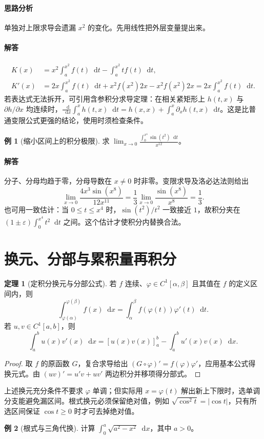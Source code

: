\documentclass[UTF8,fontset=fandol,12pt,oneside,openany]{ctexrep}
\newcommand{\dd}{\mathop{}\!\mathrm d}
\theoremstyle{definition}
\newtheorem{theorem}{定理}[chapter]
\newtheorem{example}{例}[chapter]
\begin{document}
\paragraph{思路分析} 单独对上限求导会遗漏 $x^2$ 的变化。先用线性把外层变量提出来。
\paragraph{解答}
\begin{align*}
K(x)&=x^2\int_a^{x^2}f(t)\dd t-\int_a^{x^2}tf(t)\dd t,\\
K'(x)&=2x\int_a^{x^2}f(t)\dd t+x^2f(x^2)2x-x^2f(x^2)2x
=2x\int_a^{x^2}f(t)\dd t.
\end{align*}
若表达式无法拆开，可引用含参积分求导定理：在相关紧矩形上 $h(t,x)$ 与 $\partial h/\partial x$ 均连续时，$\frac{\dd}{\dd x}\int_a^xh(t,x)\dd t=h(x,x)+\int_a^x\partial_xh(t,x)\dd t$。这是比普通变限公式更强的结论，使用时须检查条件。

\begin{example}[缩小区间上的积分极限]
求 $\lim_{x\to0}\frac{\int_0^{x^4}\sin(t^2)\dd t}{x^{12}}$。
\end{example}
\paragraph{解答} 分子、分母均趋于零，分母导数在 $x\ne0$ 时非零。变限求导及洛必达法则给出
\[\lim_{x\to0}\frac{4x^3\sin(x^8)}{12x^{11}}=\frac13\lim_{x\to0}\frac{\sin(x^8)}{x^8}=\frac13.\]
也可用一致估计：当 $0\le t\le x^4$ 时，$\sin(t^2)/t^2$ 一致接近 $1$，故积分夹在 $(1\pm\varepsilon)\int_0^{x^4}t^2\dd t$ 之间。这个估计才使积分内替换合法。

\section{换元、分部与累积量再积分}
\label{lec:11:calculation}
\begin{theorem}[定积分换元与分部公式]
若 $f$ 连续、$\varphi\in C^1[\alpha,\beta]$ 且其值在 $f$ 的定义区间内，则
\[\int_{\varphi(\alpha)}^{\varphi(\beta)}f(x)\dd x=\int_\alpha^\beta f(\varphi(t))\varphi'(t)\dd t.\]
若 $u,v\in C^1[a,b]$，则
\[\int_a^b u(x)v'(x)\dd x=[u(x)v(x)]_a^b-\int_a^b u'(x)v(x)\dd x.\]
\end{theorem}
\begin{proof}
取 $f$ 的原函数 $G$，复合求导给出 $(G\circ\varphi)'=f(\varphi)\varphi'$，应用基本公式得换元式。由 $(uv)'=u'v+uv'$ 两边积分并移项得分部式。
\end{proof}
上述换元充分条件不要求 $\varphi$ 单调；但实际用 $x=\varphi(t)$ 解出新上下限时，选单调分支能避免漏区间。根式换元必须保留绝对值，例如 $\sqrt{\cos^2t}=|\cos t|$，只有所选区间保证 $\cos t\ge0$ 时才可去掉绝对值。
\begin{example}[根式与三角代换]
计算 $\int_0^a\sqrt{a^2-x^2}\dd x$，其中 $a>0$。
\end{example}
\end{document}
